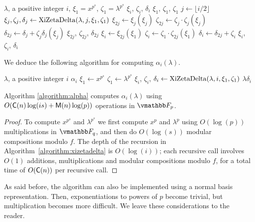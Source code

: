 \begin{algorithm}
\label{algorithm:xizetadelta}
\begin{algorithmic}[1]
\REQUIRE $\lambda$, a positive integer $i$, $\xi_1=x^{p^s}$, $\zeta_1=\lambda^{p^s}$
\ENSURE $\xi_i$, $\zeta_i$, $\delta_i$
\RETURN $\xi_1$, $\zeta_1$, $\zeta_1$
\ENDIF
\STATE $j \leftarrow \lfloor i/2\rfloor$
\STATE $\xi_{j},\zeta_{j},\delta_j \leftarrow {\rm XiZetaDelta}(\lambda,j,\xi_1,\zeta_1)$ 
\STATE $\xi_{2j} \leftarrow \xi_j(\xi_j)$
\STATE $\zeta_{2j} \leftarrow \zeta_j\cdot \zeta_j(\xi_j)$
\STATE $\delta_{2j}\leftarrow \delta_j+\zeta_j \delta_j(\xi_j)$
\RETURN $\xi_{2j}$, $\zeta_{2j}$, $\delta_{2j}$
\ENDIF
\STATE $\xi_i \leftarrow \xi_{2j}(\xi_1)$
\STATE $\zeta_i \leftarrow \zeta_1\cdot \zeta_{2j}(\xi_1)$
\STATE $\delta_i \leftarrow \delta_{2j}+\zeta_i$
\RETURN $\xi_i$, $\zeta_i$, $\delta_i$
\end{algorithmic}
\end{algorithm}
We deduce the following algorithm for computing $\alpha_i(\lambda)$.

\begin{algorithm}
\label{algorithm:alpha}
\begin{algorithmic}[1]
\REQUIRE $\lambda$, a positive integer $i$
\ENSURE $\alpha_i$
\STATE $\xi_1 \leftarrow x^{p^s}$
\STATE $\zeta_1 \leftarrow \lambda^{p^s}$
\STATE $\xi_i$, $\zeta_i$, $\delta_i \leftarrow {\rm XiZetaDelta}(\lambda,i,\xi_1,\zeta_1)$ 
\RETURN $\lambda \delta_i$
\end{algorithmic}
\end{algorithm}

\begin{proposition}
  Algorithm \ref{algorithm:alpha} computes $\alpha_i(\lambda)$ using
  $O(\mathsf{C}(n)\log(is) + \mathsf{M}(n)\log(p))$ operations in $\F_p$.
\end{proposition}
\begin{proof}
  To compute $x^{p^s}$ and $\lambda^{p^s}$ we first compute $x^p$ and
  $\lambda^p$ using $O(\log(p))$ multiplications in $\F_q$, and then
  do $O(\log (s))$ modular compositions modulo $f$. The depth of the
  recursion in Algorithm~\ref{algorithm:xizetadelta} is $O(\log(i))$;
  each recursive call involves $O(1)$ additions, multiplications and
  modular compositions modulo $f$, for a total time of $O(\mathsf{C}(n))$ per
  recursive call.
\end{proof}

As said before, the algorithm can also be implemented using a normal
basis representation. Then, exponentiations to powers of $p$ become
trivial, but multiplication becomes more difficult. We leave these
considerations to the reader.

